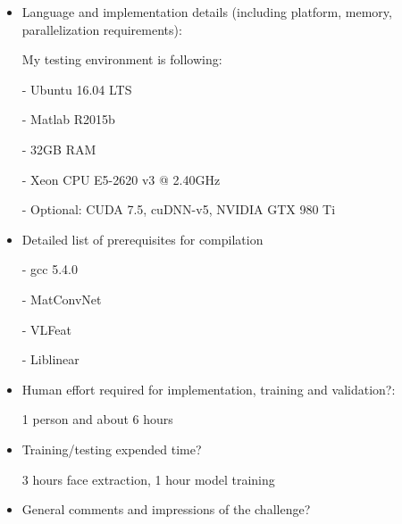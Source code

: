 \documentclass{article}
\begin{document}
\begin{itemize}
\item Language and implementation details (including platform, memory, parallelization requirements): 

My testing environment is following:

- Ubuntu 16.04 LTS

- Matlab R2015b

- 32GB RAM

- Xeon CPU E5-2620 v3 @ 2.40GHz

- Optional: CUDA 7.5, cuDNN-v5, NVIDIA GTX 980 Ti

\item Detailed list of prerequisites for compilation

- gcc 5.4.0

- MatConvNet

- VLFeat

- Liblinear

\item Human effort required for implementation, training and validation?: 

1 person and about 6 hours

\item Training/testing expended time? 

3 hours face extraction, 1 hour model training

\item General comments and impressions of the challenge?
\end{itemize}
\end{document}
